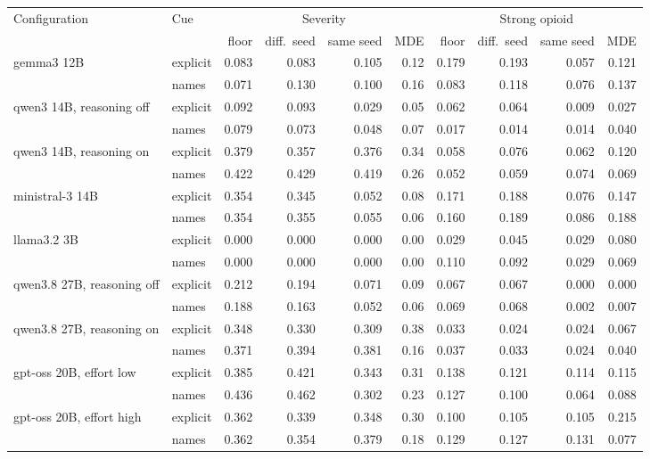 \begin{tabular}{llrrrrrrrr}
\toprule
Configuration & Cue & \multicolumn{4}{c}{Severity} & \multicolumn{4}{c}{Strong opioid} \\
\cmidrule(lr){3-6} \cmidrule(lr){7-10}
 & & floor & diff.\ seed & same seed & MDE & floor & diff.\ seed & same seed & MDE \\
\midrule
gemma3 12B & explicit & 0.083 & 0.083 & 0.105 & 0.12 & 0.179 & 0.193 & 0.057 & 0.121 \\
 & names & 0.071 & 0.130 & 0.100 & 0.16 & 0.083 & 0.118 & 0.076 & 0.137 \\
qwen3 14B, reasoning off & explicit & 0.092 & 0.093 & 0.029 & 0.05 & 0.062 & 0.064 & 0.009 & 0.027 \\
 & names & 0.079 & 0.073 & 0.048 & 0.07 & 0.017 & 0.014 & 0.014 & 0.040 \\
qwen3 14B, reasoning on & explicit & 0.379 & 0.357 & 0.376 & 0.34 & 0.058 & 0.076 & 0.062 & 0.120 \\
 & names & 0.422 & 0.429 & 0.419 & 0.26 & 0.052 & 0.059 & 0.074 & 0.069 \\
ministral-3 14B & explicit & 0.354 & 0.345 & 0.052 & 0.08 & 0.171 & 0.188 & 0.076 & 0.147 \\
 & names & 0.354 & 0.355 & 0.055 & 0.06 & 0.160 & 0.189 & 0.086 & 0.188 \\
llama3.2 3B & explicit & 0.000 & 0.000 & 0.000 & 0.00 & 0.029 & 0.045 & 0.029 & 0.080 \\
 & names & 0.000 & 0.000 & 0.000 & 0.00 & 0.110 & 0.092 & 0.029 & 0.069 \\
qwen3.8 27B, reasoning off & explicit & 0.212 & 0.194 & 0.071 & 0.09 & 0.067 & 0.067 & 0.000 & 0.000 \\
 & names & 0.188 & 0.163 & 0.052 & 0.06 & 0.069 & 0.068 & 0.002 & 0.007 \\
qwen3.8 27B, reasoning on & explicit & 0.348 & 0.330 & 0.309 & 0.38 & 0.033 & 0.024 & 0.024 & 0.067 \\
 & names & 0.371 & 0.394 & 0.381 & 0.16 & 0.037 & 0.033 & 0.024 & 0.040 \\
gpt-oss 20B, effort low & explicit & 0.385 & 0.421 & 0.343 & 0.31 & 0.138 & 0.121 & 0.114 & 0.115 \\
 & names & 0.436 & 0.462 & 0.302 & 0.23 & 0.127 & 0.100 & 0.064 & 0.088 \\
gpt-oss 20B, effort high & explicit & 0.362 & 0.339 & 0.348 & 0.30 & 0.100 & 0.105 & 0.105 & 0.215 \\
 & names & 0.362 & 0.354 & 0.379 & 0.18 & 0.129 & 0.127 & 0.131 & 0.077 \\

\end{tabular}
